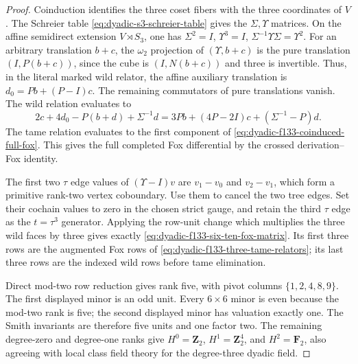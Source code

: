 \documentclass[11pt]{article}
\theoremstyle{definition}
\begin{document}
\begin{proof}
Coinduction
identifies the
three coset fibers
with the three
coordinates of
$V$.  The Schreier
table
\eqref{eq:dyadic-s3-schreier-table}
gives the
$\Sigma,\Upsilon$
matrices.
On the
affine semidirect
extension
$V\rtimes S_3$,
one has
$\Sigma^2=I$,
$\Upsilon^3=I$,
$\Sigma^{-1}\Upsilon\Sigma
=\Upsilon^2$.
For an arbitrary
translation $b+c$,
the $\omega_2$
projection of
$(\Upsilon,b+c)$
is the pure
translation
$(I,P(b+c))$,
since the
cube is
$(I,N(b+c))$
and three is
invertible.
Thus, in the
literal marked
wild relator,
the affine
auxiliary translation
is
$d_0=Pb+(P-I)c$.
The remaining
commutators of
pure translations
vanish.
The wild
relation evaluates
to
\[
2c+4d_0-P(b+d)
+\Sigma^{-1}d
=
3Pb+(4P-2I)c+
(\Sigma^{-1}-P)d.
\]
The tame relation
evaluates to the
first component of
\eqref{eq:dyadic-f133-coinduced-full-fox}.
This gives the
full completed
Fox differential
by the crossed
derivation--Fox
identity.

The first
two $\tau$ edge
values of
$(\Upsilon-I)v$
are $v_1-v_0$
and $v_2-v_1$,
which form
a primitive
rank-two vertex
coboundary.
Use them to
cancel the
two tree edges.
Set their
cochain values
to zero in
the chosen
strict gauge,
and retain the
third $\tau$
edge as the
$t=\tau^3$
generator.
Applying the
row-unit change
which multiplies
the three wild
faces by three
gives exactly
\eqref{eq:dyadic-f133-six-ten-fox-matrix}.
Its first
three rows
are the augmented
Fox rows of
\eqref{eq:dyadic-f133-three-tame-relators};
its last three
rows are the
indexed wild
rows before
tame elimination.

Direct
mod-two row
reduction gives
rank five,
with pivot
columns
$\{1,2,4,8,9\}$.
The first
displayed minor
is an odd
unit.
Every
$6\times6$
minor is
even because
the mod-two
rank is five;
the second
displayed
minor has
valuation exactly
one.  The Smith
invariants are
therefore five
units and one
factor two.
The remaining
degree-zero
and degree-one
ranks give
$H^0=\mathbf Z_2$,
$H^1=\mathbf Z_2^4$,
and $H^2=\mathbf F_2$,
also agreeing
with local
class field
theory for the
degree-three
dyadic field.
\end{proof}
\end{document}
